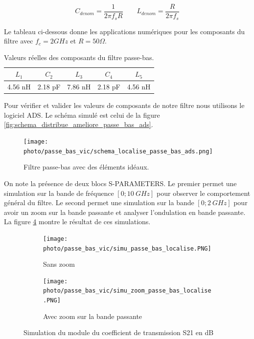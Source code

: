 \documentclass[french]{article}
\begin{document}
\begin{equation}
	C_{denom} = \frac{1}{2\pi f_s R}
	\qquad
	L_{denom} = \frac{R}{2\pi f_s}
\end{equation}

Le tableau ci-dessous donne les applications numériques pour les composants du filtre avec $f_c = 2GHz$ et $R = 50\Omega$.

\begin{table}[H]
	\centering
	\begin{tabular}{|c|c|c|c|c|}
		\hline
		$L_1$ & $C_2$ & $L_3$ & $C_4$ & $L_5$\\
		\hline
		4.56 nH & 2.18 pF & 7.86 nH & 2.18 pF & 4.56 nH\\
		\hline
	\end{tabular}
	\caption{Valeurs réelles des composants du filtre passe-bas.}
	\label{tab:valeurs_composant_passe_bas}
\end{table}

Pour vérifier et valider les valeurs de composants de notre filtre nous utilisons le logiciel ADS. Le schéma simulé est celui de la figure \ref{fig:schema_distribue_ameliore_passe_bas_ads}. 

\begin{figure}[H]
	\centering
	\texttt{[image: photo/passe\_bas\_vic/schema\_localise\_passe\_bas\_ads.png]}
	\caption{Filtre passe-bas avec des éléments idéaux.}
	\label{fig:schema_localise_passe_bas_ads}
\end{figure}

On note la présence de deux blocs S-PARAMETERS. Le premier permet une simulation sur la bande de fréquence $[0; 10\ GHz]$ pour observer le comportement général du filtre. Le second permet une simulation sur la bande $[0; 2\ GHz]$ pour avoir un zoom sur la bande passante et analyser l'ondulation en bande passante. La figure \ref{fig:simu_passe_bas_localise_global} montre le résultat de ces simulations.

\begin{figure}[H]
	\centering
	\begin{subfigure}[b]{0.49\textwidth}
		\texttt{[image: photo/passe\_bas\_vic/simu\_passe\_bas\_localise.PNG]}
		\caption{Sans zoom}
		\label{fig:simu_passe_bas_localise}
	\end{subfigure}
	\begin{subfigure}[b]{0.49\textwidth}
		\texttt{[image: photo/passe\_bas\_vic/simu\_zoom\_passe\_bas\_localise.PNG]}
		\caption{Avec zoom sur la bande passante}
		\label{fig:simu_zoom_passe_bas_localise}
	\end{subfigure}
	\caption{Simulation du module du coefficient de transmission S21 en dB}
	\label{fig:simu_passe_bas_localise_global}
\end{figure}
\end{document}
